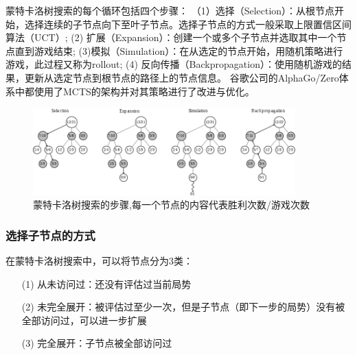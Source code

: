蒙特卡洛树搜索的每个循环包括四个步骤\cite{RePEc:wsi:nmncxx:v:04:y:2008:i:03:n:s1793005708001094}：
（1）选择（Selection）：从根节点开始，选择连续的子节点向下至叶子节点。选择子节点的方式一般采取上限置信区间算法（UCT）\cite{10.1007/11871842_29};
(2) 扩展（Expansion）：创建一个或多个子节点并选取其中一个节点直到游戏结束;
(3)模拟（Simulation）：在从选定的节点开始，用随机策略进行游戏，此过程又称为rollout;
(4) 反向传播（Backpropagation）：使用随机游戏的结果，更新从选定节点到根节点的路径上的节点信息。
谷歌公司的AlphaGo/Zero体系中都使用了MCTS的架构并对其策略进行了改进与优化。

\begin{figure}[htb]
    \centering
    \includegraphics[width=0.9\textwidth]{mctswiki.png}
    \caption[mcts]{%
    蒙特卡洛树搜索的步骤,每一个节点的内容代表胜利次数/游戏次数\cite{RePEc:wsi:nmncxx:v:04:y:2008:i:03:n:s1793005708001094}%
      }
    \label{fig:mcts}
  \end{figure}
\newpage

\subsubsection{选择子节点的方式}
在蒙特卡洛树搜索中，可以将节点分为3类：

\begin{itemize}
    \item [(1)] 
    从未访问过：还没有评估过当前局势
    \item [(2)]
    未完全展开：被评估过至少一次，但是子节点（即下一步的局势）没有被全部访问过，可以进一步扩展
    \item [(3)]
    完全展开：子节点被全部访问过
\end{itemize}

